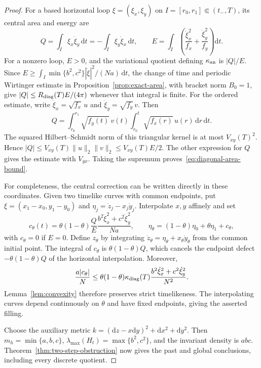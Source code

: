 \documentclass[10pt,a4paper]{article}
\numberwithin{equation}{section}
\theoremstyle{definition}
\theoremstyle{remark}
\newcommand{\dd}{\mathrm d}
\begin{document}
\begin{proof}
For a based horizontal loop $\xi=(\xi_x,\xi_y)$ on
$I=[r_0,r_1]\Subset(t_-,T)$, its central area and energy are
\[
 Q=\int_I\xi_x\dot\xi_y\,\dd t
   =-\int_I\xi_y\dot\xi_x\,\dd t,\qquad
 E=\int_I\left(\frac{\dot\xi_x^2}{f_x}
                         +\frac{\dot\xi_y^2}{f_y}\right)\dd t.
\]
For a nonzero loop, $E>0$, and the variational quotient defining
$\kappa_{\rm an}$ is $|Q|/E$.
Since
$E\ge\int_I\min\{b^2,c^2\}|\dot\xi|^2/(Na)\,\dd t$,
the change of time and periodic Wirtinger estimate in
Proposition~\ref{prop:exact-area}, with bracket norm $B_0=1$, give
$|Q|\le R_{\rm diag}(T)E/(4\pi)$ whenever that integral is finite.
For the ordered estimate, write
$\dot\xi_x=\sqrt{f_x}\,u$ and
$\dot\xi_y=\sqrt{f_y}\,v$.  Then
\[
 Q=\int_{r_0}^{r_1}\sqrt{f_y(t)}\,v(t)
             \int_{r_0}^t\sqrt{f_x(r)}\,u(r)\,\dd r\,\dd t.
\]
The squared Hilbert--Schmidt norm of this triangular kernel is at most
$V_{xy}(T)^2$.  Hence
$|Q|\le V_{xy}(T)\|u\|_2\|v\|_2\le V_{xy}(T)E/2$.
The other expression for $Q$ gives the estimate with $V_{yx}$.
Taking the supremum proves~\eqref{eq:diagonal-area-bound}.

For completeness, the central correction can be written directly in
these coordinates.  Given two timelike curves with common endpoints,
put $\xi=(x_1-x_0,y_1-y_0)$ and
$\eta_j=\dot z_j-x_j\dot y_j$.  Interpolate $x,y$ affinely and set
\[
 c_\theta(t)=\theta(1-\theta)\frac QE
                  \frac{b^2\dot\xi_x^2+c^2\dot\xi_y^2}{Na},
 \qquad
 \eta_\theta=(1-\theta)\eta_0+\theta\eta_1+c_\theta,
\]
with $c_\theta=0$ if $E=0$.  Define $z_\theta$ by integrating
$\dot z_\theta=\eta_\theta+x_\theta\dot y_\theta$ from the common
initial point.  The integral of $c_\theta$ is
$\theta(1-\theta)Q$, which cancels the endpoint defect
$-\theta(1-\theta)Q$ of the horizontal interpolation.  Moreover,
\[
 \frac{a|c_\theta|}{N}
 \le\theta(1-\theta)\kappa_{\rm diag}(T)
                 \frac{b^2\dot\xi_x^2+c^2\dot\xi_y^2}{N^2}.
\]
Lemma~\ref{lem:convexity} therefore preserves strict timelikeness.
The interpolating curves depend continuously on $\theta$ and have fixed
endpoints, giving the asserted filling.

Choose the auxiliary metric
$k=(\dd z-x\dd y)^2+\dd x^2+\dd y^2$.  Then
$m_h=\min\{a,b,c\}$,
$\lambda_{\max}(H_t)=\max\{b^2,c^2\}$, and the invariant density is
$abc$.  Theorem~\ref{thm:two-step-obstruction} now gives the past and
global conclusions, including every discrete quotient.
\end{proof}
\end{document}
